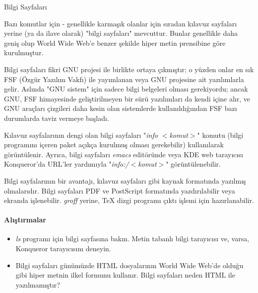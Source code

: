 \begin{section}{Bilgi Sayfaları}

Bazı komutlar için - genellikle karmaşık olanlar için sıradan kılavuz sayfaları yerine (ya da ilave olarak) "bilgi sayfaları" mevcuttur. Bunlar genellikle daha geniş olup World Wide Web'e benzer şekilde hiper metin prensibine göre kurulmuştur.

Bilgi sayfaları fikri GNU projesi ile birlikte ortaya çıkmıştır; o yüzden onlar en sık FSF (Özgür Yazılım Vakfı) ile  yayımlanan veya GNU projesine ait yazılımlarla gelir. Aslında "GNU sistem" için sadece bilgi belgeleri olması gerekiyordu; ancak GNU, FSF himayesinde geliştirilmeyen bir sürü yazılımları da kendi içine alır, ve GNU araçları çizgileri daha kesin olan sistemlerde kullanıldığından FSF bazı durumlarda taviz vermeye başladı.

Kılavuz sayfalarının dengi olan bilgi sayfaları "\emph{info $<$komut$>$}" komutu (bilgi programını içeren paket açıkça kurulmuş olması gerekebilir) kullanılarak görüntülenir. Ayrıca, bilgi sayfaları \emph{emacs} editöründe veya KDE web tarayıcısı Konqueror'da URL'ler yardımıyla "\emph{info:/$<$komut$>$}" görüntülenebilir.

Bilgi sayfalarının bir avantajı, kılavuz sayfaları gibi kaynak formatında yazılmış olmalarıdır. Bilgi sayfaları PDF ve PostScript formatında yazdırılabilir veya ekranda işlenebilir. \emph{groff} yerine, \TeX{} dizgi programı çıktı işlemi için hazırlanabilir.

\paragraph{Alıştırmalar}{
\begin{itemize}
 \item \emph{ls} programı için bilgi sayfasına bakın. Metin tabanlı bilgi tarayıcısı ve, varsa, Konqueror tarayıcısını deneyin.
 \item Bilgi sayfaları günümüzde HTML dosyalarının World Wide Web'de olduğu gibi hiper metnin ilkel formunu kullanır. Bilgi sayfaları neden HTML ile yazılmamıştır?
\end{itemize}}
\end{section}
